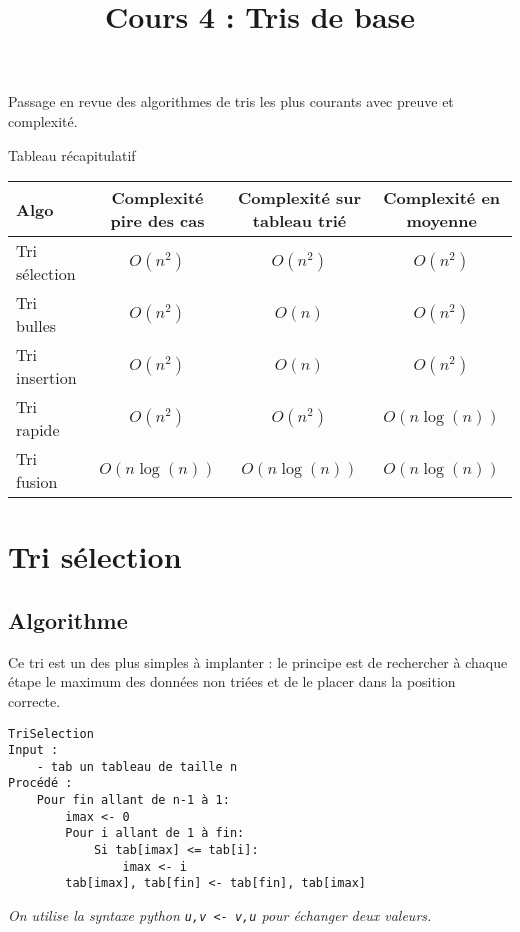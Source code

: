 \documentclass{../cours}
\title{Cours 4 : Tris de base}
\begin{document}
\maketitle

Passage en revue des algorithmes de tris les plus courants avec preuve et complexité. 

Tableau récapitulatif

\begin{tabular}{|l|c|c|c|}
\hline
Algo & Complexité pire des cas & Complexité sur tableau trié & Complexité en moyenne \\
\hline
Tri sélection & $O(n^2)$ & $O(n^2)$ & $O(n^2)$ \\
\hline
Tri bulles & $O(n^2)$ & $O(n)$ & $O(n^2)$ \\
\hline
Tri insertion & $O(n^2)$ & $O(n)$ & $O(n^2)$ \\
\hline
Tri rapide & $O(n^2)$ & $O(n^2)$ & $O(n \log(n))$ \\
\hline
Tri fusion & $O(n \log(n))$ & $O(n \log(n))$ & $O(n \log(n))$ \\
\hline
\end{tabular}
 
\section{Tri sélection}

\subsection{Algorithme}

Ce tri est un des plus simples à implanter : le principe est de rechercher à chaque étape le maximum des données non triées et de le placer dans la position correcte.

\begin{lstlisting}
TriSelection
Input :
    - tab un tableau de taille n
Procédé :
    Pour fin allant de n-1 à 1:
        imax <- 0
        Pour i allant de 1 à fin:
            Si tab[imax] <= tab[i]:
                imax <- i
        tab[imax], tab[fin] <- tab[fin], tab[imax] 
\end{lstlisting}

\textit{On utilise la syntaxe python {\tt u,v <- v,u} pour échanger deux valeurs.}
\end{document}

